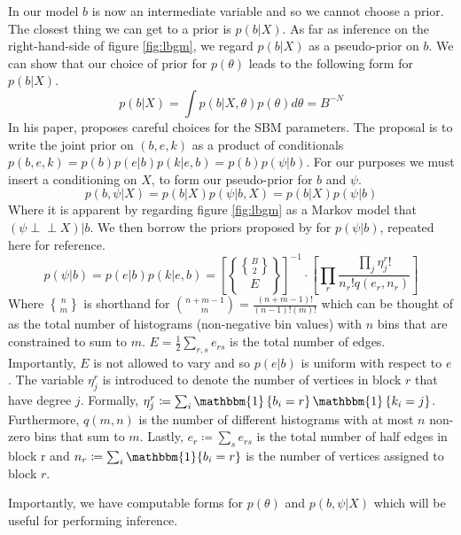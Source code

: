 \documentclass{article}
\newcommand{\one}{\mathbbm{1}}
\newcommand{\indep}{\perp \!\!\! \perp}
\newcommand{\specialchoose}{\genfrac{\{}{\}}{0pt}{}}
\begin{document}
In our model $b$ is now an intermediate variable and so we cannot choose a prior. The closest thing we can get to a prior is $p(b | X)$. As far as inference on the right-hand-side of figure \ref{fig:lbgm}, we regard $p(b | X)$ as a pseudo-prior on $b$. We can show that our choice of prior for $p(\theta)$ leads to the following form for $p(b | X)$.
%
\begin{equation}
	p(b | X) = \int p(b | X, \theta) p(\theta) d\theta = B^{-N}
\end{equation}
%
In his paper, \citet{Peixoto-Bayesian-Microcanonical} proposes careful choices for the SBM parameters. The proposal is to write the joint prior on $(b, e, k)$ as a product of conditionals $p(b, e, k) = p(b) p(e | b) p(k | e, b)= p(b) p(\psi | b)$. For our purposes we must insert a conditioning on $X$, to form our pseudo-prior for $b$ and $\psi$.
%
\begin{equation}
	p(b, \psi | X) = p(b | X) p(\psi | b, X) = p(b | X) p(\psi | b)
\end{equation}
%
Where it is apparent by regarding figure \ref{fig:lbgm} as a Markov model that $(\psi \indep X) | b$. We then borrow the priors proposed by \citet{Peixoto-Bayesian-Microcanonical} for $p(\psi | b)$, repeated here for reference.
%
\begin{equation}
	p(\psi | b) = p(e | b) p(k | e, b) = \left[ \specialchoose{ \specialchoose{B}{2} }{ E} \right]^{-1} 
	\cdot \left[ \prod_r \frac{\prod_j \eta_j^r !}{n_r! q(e_r, n_r)} \right]
\end{equation}
%
Where $\specialchoose{n}{m}$ is shorthand for $\binom{n+m-1}{m} = \frac{(n+m-1)!}{(n-1)!(m)!}$ which can be thought of as the total number of histograms (non-negative bin values) with $n$ bins that are constrained to sum to $m$. $E = \frac{1}{2} \sum_{r,s} e_{rs}$ is the total number of edges. Importantly, $E$ is not allowed to vary and so $p(e|b)$ is uniform with respect to $e$. The variable $\eta_j^r$ is introduced to denote the number of vertices in block $r$ that have degree $j$. Formally, $\eta_j^r \coloneqq \sum_{i} \one\left\{b_i = r \right\} \one \left\{k_i = j \right\}$. Furthermore, $q(m, n)$ is the number of different histograms with at most $n$ non-zero bins that sum to $m$. Lastly, $e_r \coloneqq \sum_{s} e_{rs}$ is the total number of half edges in block r and $n_r \coloneqq \sum_{i} \one{b_i = r}$ is the number of vertices assigned to block $r$.

Importantly, we have computable forms for $p(\theta)$ and $p(b, \psi | X)$ which will be useful for performing inference.
\end{document}
